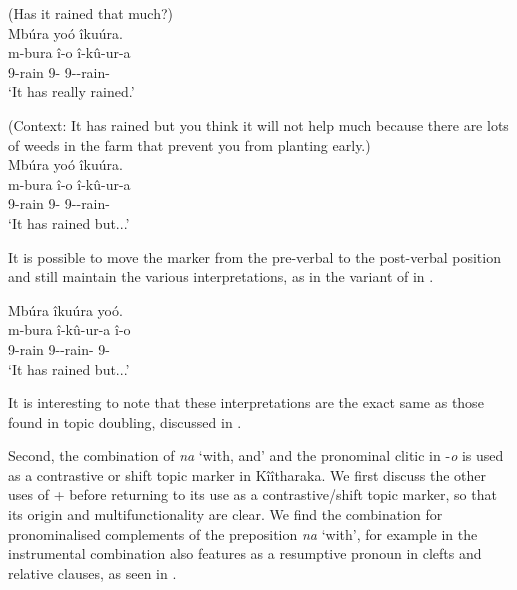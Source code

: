 \documentclass[output=paper]{langscibook}
\begin{document}
\z

\ea
(Has it rained that much?)\\
Mbúra yoó îkuúra.\\
\gll
m-bura  î-o  î-kû-ur-a\\
9-rain  9-\PRO{} 9\SM-\PRS{}-rain-\FV{}\\
\glt
‘It has really rained.’ \jambox*{[intensive]}

\z

\ea
\label{bkm:Ref119738548}
(Context: It has rained but you think it will not help much because there are lots of weeds in the farm that prevent you from planting early.)\\
  Mbúra yoó îkuúra.\\
\gll
m-bura  î-o  î-kû-ur-a\\
9-rain  9-\PRO{} 9\SM-\PRS{}-rain-\FV{}\\
\glt
‘It has rained but...’       \jambox*{[depreciative]}

\z

It is possible to move the marker from the pre-verbal to the post-verbal position and still maintain the various interpretations, as in the variant of  in .

\ea
\label{bkm:Ref119738559}
Mbúra îkuúra   yoó.\\
\gll
m-bura  î-kû-ur-a  î-o\\
9-rain 9\SM-\PRS{}-rain-\FV{}  9-\PRO{}\\
\glt
‘It has rained but...’

\z

It is interesting to note that these interpretations are the exact same as those found in topic doubling, discussed in .

Second, the combination of \textit{na} ‘with, and’ and the pronominal clitic in -\textit{o} is used as a contrastive or shift topic marker in Kîîtharaka. We first discuss the other uses of \NA+{} \PRO{} before returning to its use as a contrastive/shift topic marker, so that its origin and multifunctionality are clear. We find the combination for pronominalised complements of the preposition \textit{na} ‘with’, for example in the instrumental  combination also features as a resumptive pronoun in clefts and relative clauses, as seen in .
\end{document}
